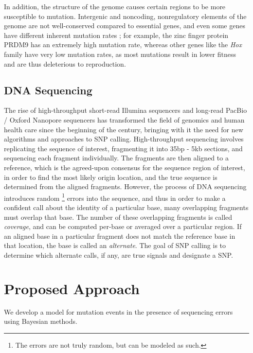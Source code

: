 \documentclass[10pt,letterpaper]{article}
\begin{document}
\par In addition, the structure of the genome causes certain regions to be more susceptible to mutation. Intergenic and noncoding, nonregulatory elements of the genome are not well-conserved
compared to essential genes, and even some genes have different inherent mutation rates \cite{4}; for example, the zinc finger protein PRDM9 has an extremely high mutation rate, whereas other genes
like the \textit{Hox} family have very low mutation rates, as most mutations result in lower fitness and are thus deleterious to reproduction.

\subsection{DNA Sequencing}

The rise of high-throughput short-read Illumina sequencers and long-read PacBio / Oxford Nanopore sequencers has transformed the field of genomics and human health care since the beginning of the century,
bringing with it the need for new algorithms and approaches to SNP calling. High-throughput sequencing involves replicating the sequence of interest, fragmenting it into 35bp - 5kb sections, and sequencing
each fragment individually. The fragments are then aligned to a reference, which is the agreed-upon consensus for the sequence region of interest, in order to find the most likely origin location, and the
true sequence is determined from the aligned fragments. However, the process of DNA sequencing introduces random \footnote{The errors are not truly random, but can be modeled as such.} errors into the sequence,
and thus in order to make a confident call about the identity of a particular base, many overlapping fragments must overlap that base. The number of these overlapping fragments is called \textit{coverage},
and can be computed per-base or averaged over a particular region. If an aligned base in a particular fragment does not match the reference base in that location, the base is called an \textit{alternate}.
The goal of SNP calling is to determine which alternate calls, if any, are true signals and designate a SNP.

\section{Proposed Approach}

We develop a model for mutation events in the presence of sequencing errors using Bayesian methods.
\end{document}
